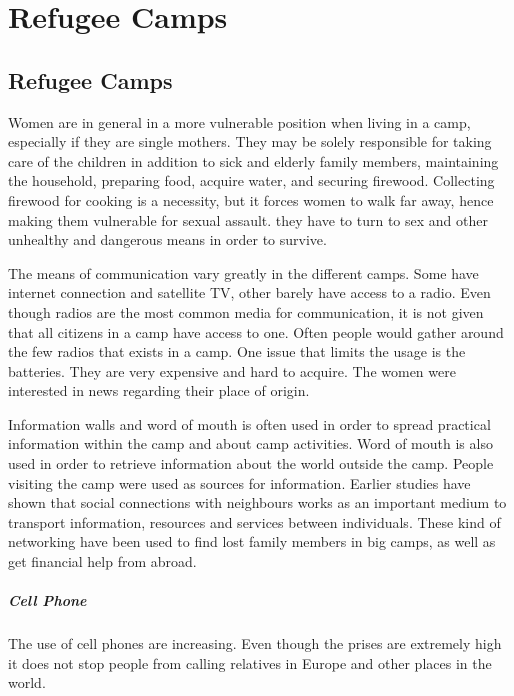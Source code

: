 \chapter{Refugee Camps}
\label{chp:refugeecamps} 

\section{Refugee Camps}

Women are in general in a more vulnerable position when living in a  camp, especially if they are single mothers. They may be solely responsible for taking care of the children in addition to sick and elderly family members, maintaining the household, preparing food, acquire water, and securing firewood. Collecting firewood for cooking is a necessity, but it forces women  to walk far away, hence making them vulnerable for sexual assault. they have to turn to sex and other unhealthy and dangerous means in order to survive. \cite{womenRefugee} 


The means of communication vary greatly in the different camps. Some have internet connection and satellite TV, other barely have access to a radio. Even though radios are the most common media for communication, it is not given that all citizens in a camp have access to one. Often people would gather around the few radios that exists in a camp. One issue that limits the usage is the batteries. They are very expensive and hard to acquire. The women were interested in news regarding their place of origin. 

Information walls and word of mouth is often used in order to spread practical information within the camp and about camp activities. Word of mouth is also used in order to retrieve information about the world outside the camp. People visiting the camp were used as sources for information. Earlier studies have shown that social connections with neighbours works as an important medium to transport information, resources and services between individuals. These kind of networking have been used to find lost family members in big camps, as well as get financial help from abroad.   
\cite{womenRefugee}  



\paragraph{Cell Phone}
The use of cell phones are increasing. Even though the prises are extremely high it does not stop people from calling relatives in Europe and other places in the world. 
\cite{womenRefugee} 

